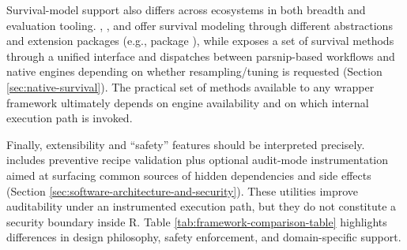 Survival-model support also differs across ecosystems in both breadth and evaluation tooling. , , and  offer survival modeling through different abstractions and extension packages (e.g.,  package \citep{Hvitfeldt:2025_censored_Rpkg}), while  exposes a set of survival methods through a unified interface and dispatches between parsnip-based workflows and native engines depending on whether resampling/tuning is requested (Section \ref{sec:native-survival}). The practical set of methods available to any wrapper framework ultimately depends on engine availability and on which internal execution path is invoked.

Finally, extensibility and ``safety'' features should be interpreted precisely.  includes preventive recipe validation plus optional audit-mode instrumentation aimed at surfacing common sources of hidden dependencies and side effects (Section \ref{sec:software-architecture-and-security}). These utilities improve auditability under an instrumented execution path, but they do not constitute a security boundary inside R. Table \ref{tab:framework-comparison-table} highlights differences in design philosophy, safety enforcement, and domain-specific support.

